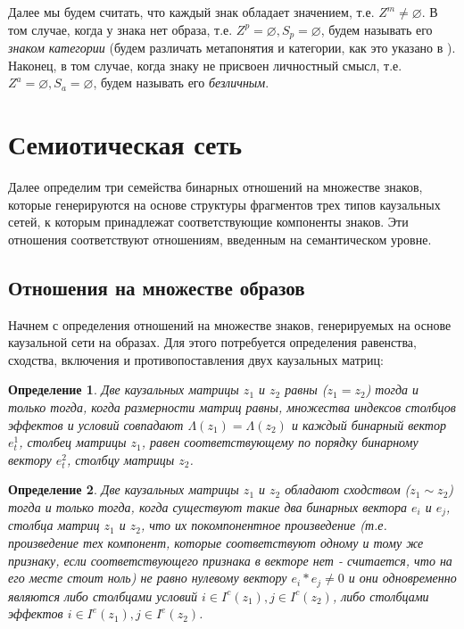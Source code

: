 \documentclass[12pt]{scrartcl}
\newtheorem{definition}{Определение}
\begin{document}
	Далее мы будем считать, что каждый знак обладает значением, т.е. $Z^m\not = \varnothing$. В том случае, когда у знака нет образа, т.е. $Z^p=\varnothing,S_p=\varnothing$, будем называть его \textit{знаком категории} (будем различать метапонятия и категории, как это указано в \cite{Osipov1997}). Наконец, в том случае, когда знаку не присвоен личностный смысл, т.е. $Z^a=\varnothing, S_a=\varnothing$, будем называть его \textit{безличным}.
	
	\section{Семиотическая сеть}\label{sec:semnetwork}
	
	Далее определим три семейства бинарных отношений на множестве знаков, которые  генерируются на основе структуры фрагментов трех типов каузальных сетей, к которым принадлежат соответствующие компоненты знаков. Эти отношения соответствуют отношениям, введенным на семантическом уровне.
		
	\subsection{Отношения на множестве образов}	
	
	Начнем с определения отношений на множестве знаков, генерируемых на основе каузальной сети на образах. Для этого потребуется определения равенства, сходства, включения и противопоставления двух каузальных матриц:
	
	\begin{definition}
		Две каузальных матрицы $z_1$ и $z_2$ равны ($z_1=z_2$) тогда и только тогда, когда размерности матриц равны, множества индексов столбцов эффектов и условий совпадают $\Lambda({z_1})=\Lambda({z_2})$ и каждый бинарный вектор $e_t^1$, столбец матрицы $z_1$, равен соответствующему по порядку бинарному вектору $e_t^2$, столбцу матрицы $z_2$.
	\end{definition}
	
	\begin{definition}
		Две каузальных матрицы $z_1$ и $z_2$ обладают сходством ($z_1\sim z_2$) тогда и только тогда, когда  существуют такие два бинарных вектора $e_i$ и $e_j$, столбца матриц $z_1$ и $z_2$, что их покомпонентное произведение (т.е. произведение тех компонент, которые соответствуют одному и тому же признаку, если соответствующего признака в векторе нет - считается, что на его месте стоит ноль) не равно нулевому вектору $e_i*e_j\not = 0$ и они одновременно являются либо столбцами условий $i\in I^c(z_1), j\in I^c(z_2)$, либо столбцами эффектов $i\in I^e(z_1), j\in I^e(z_2)$.
	\end{definition}
	
\end{document}
